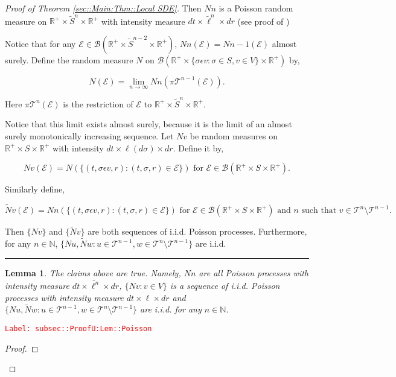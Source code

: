 \documentclass[12pt]{article}
\newcommand{\mb}{\mathbb}
\newcommand{\mc}{\mathcal}
\newcommand{\ms}{\mathscr}
\newcommand{\ra}{\rightarrow}
\newcommand{\te}{\text}
\newcommand{\ep}{\epsilon}
\newcommand{\tr}{\textcolor{red}}
\newcommand{\labe}[1]{\tr{\texttt{Label: #1}}}
\newcommand{\ind}{\hspace{24pt}}
\newcommand{\lin}{\rule{\linewidth}{0.4 pt}}
\renewcommand{\v}{v}							%
\newcommand{\vv}{u}								%
\newcommand{\vvv}{w}							%
\renewcommand{\S}{S}							%
\newcommand{\s}{\sigma}							%
\newcommand{\ev}{\ep}							%
\renewcommand{\t}{t}							%
\newcommand{\proj}{\pi}							%
\newcommand{\tree}{\mc{T}}						%
\newcommand{\sln}[1]{^{#1}}						%
\newcommand{\poiss}{N}							%
\newcommand{\Sm}{\ell}							%
\renewcommand{\r}{r}							%
\newcommand{\alt}[1]{\widetilde{#1}}			%
\newcommand{\evnt}{\mc{E}}						%
\newtheorem{lem}[thms]{Lemma}
\begin{document}
\begin{proof}[Proof of Theorem \ref{sec::Main:Thm::Local SDE}]
Then \(\poiss{n}\) is a Poisson random measure on \(\mb{R}^+\times\alt{\S}^n\times \mb{R}^+\) with intensity measure \(d\t\times \alt{\Sm}^n\times d\r\) (see proof of \cite[Theorem 14.7.1(b)]{DalVer08})

\ind Notice that for any \(\evnt \in \ms{B}(\mb{R}^+\times \alt{\S}^{n-2}\times \mb{R}^+)\), \(\poiss{n}(\evnt) = \poiss{n-1}(\evnt)\) almost surely. Define the random measure \(\poiss{}\) on \(\ms{B}(\mb{R}^+\times \{\s\ev{\v}:\s\in \S,\v \in  V\}\times \mb{R}^+)\) by,

\[\poiss{}(\evnt) = \lim_{n \ra\infty}\poiss{n}\left(\proj{\tree\sln{n-1}}{}(\evnt)\right).\]

Here \(\proj{\tree\sln{n}}{}(\evnt)\) is the restriction of \(\evnt\) to \(\mb{R}^+\times \alt{\S}^n\times\mb{R}^+\). 

\ind Notice that this limit exists almost surely, because it is the limit of an almost surely monotonically increasing sequence. Let \(\poiss{\v}\) be random measures on \(\mb{R}^+\times\S\times\mb{R}^+\) with intensity \(d\t\times\Sm(d\s)\times d\r\). Define it by,

\[\poiss{\v}(\evnt) = \poiss{}\left(\{(\t,\s\ev{\v},\r):(\t,\s,\r)\in \evnt\}\right) \te{ for } \evnt \in \ms{B}(\mb{R}^+\times\S\times\mb{R}^+).\]

Similarly define,

\[\alt{\poiss}{\v}(\evnt) = \poiss{n}\left(\{(\t,\s\ev{\v},\r):(\t,\s,\r)\in \evnt\}\right)\te{ for } \evnt \in \ms{B}(\mb{R}^+\times\S\times\mb{R}^+)\te{ and }n\te{ such that } \v\in \tree\sln{n}\setminus\tree\sln{n-1}.\]

Then \(\{\poiss{\v}\}\) and \(\{\alt{\poiss}{\v}\}\) are both sequences of i.i.d. Poisson processes. Furthermore, for any \(n \in \mb{N}\), \(\{\poiss{\vv},\alt{\poiss}{\vvv}:\vv\in \tree\sln{n-1},\vvv\in\tree\sln{n}\setminus\tree\sln{n-1}\}\) are i.i.d.

\lin

\begin{lem}
The claims above are true. Namely, \(\poiss{n}\) are all Poisson processes with intensity measure \(d\t\times\alt{\Sm^{n}}\times d\r\), \(\{\poiss{\v}:\v\in V\}\) is a sequence of i.i.d. Poisson processes with intensity measure \(d\t\times\Sm\times d\r\) and \(\{\poiss{\vv},\alt{\poiss}{\vvv}:\vv\in \tree\sln{n-1},\vvv\in\tree\sln{n}\setminus\tree\sln{n-1}\}\) are i.i.d. for any \(n \in \mb{N}\).

\label{subsec::ProofU:Lem::Poisson}
\end{lem}
\labe{subsec::ProofU:Lem::Poisson}
\begin{proof}


\end{proof}
\end{proof}
\end{document}
